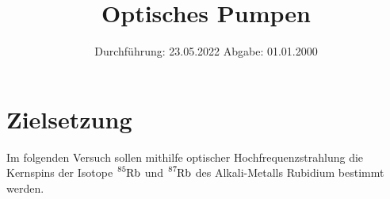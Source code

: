 

\def\Rb#1{\ce{^{#1}Rb}}

\subject{V21}
\title{Optisches Pumpen}
\date{
    Durchführung: 23.05.2022
     \hspace{3em}
    Abgabe: 01.01.2000 %
}


\maketitle
\thispagestyle{empty}
\tableofcontents
\newpage

\section{Zielsetzung}

    Im folgenden Versuch sollen mithilfe optischer Hochfrequenzstrahlung die Kernspins der Isotope $\ce{^{85}Rb}$ und $\ce{^{87}Rb}$ des Alkali-Metalls Rubidium bestimmt werden.


\clearpage


\clearpage


\clearpage


\clearpage

\printbibliography


